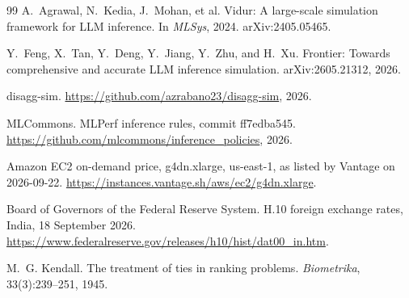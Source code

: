\documentclass[10pt,twocolumn]{article}
\begin{document}
\begin{thebibliography}{99}
A.~Agrawal, N.~Kedia, J.~Mohan, et al.
\newblock Vidur: A large-scale simulation framework for LLM inference.
\newblock In \emph{MLSys}, 2024. arXiv:2405.05465.

Y.~Feng, X.~Tan, Y.~Deng, Y.~Jiang, Y.~Zhu, and H.~Xu.
\newblock Frontier: Towards comprehensive and accurate LLM inference simulation.
\newblock arXiv:2605.21312, 2026.

disagg-sim.
\newblock \url{https://github.com/azrabano23/disagg-sim}, 2026.

MLCommons.
\newblock MLPerf inference rules, commit ff7edba545.
\newblock \url{https://github.com/mlcommons/inference_policies}, 2026.

Amazon EC2 on-demand price, g4dn.xlarge, us-east-1, as listed by Vantage on 2026-09-22.
\newblock \url{https://instances.vantage.sh/aws/ec2/g4dn.xlarge}.

Board of Governors of the Federal Reserve System.
\newblock H.10 foreign exchange rates, India, 18 September 2026.
\newblock \url{https://www.federalreserve.gov/releases/h10/hist/dat00_in.htm}.

M.~G. Kendall.
\newblock The treatment of ties in ranking problems.
\newblock \emph{Biometrika}, 33(3):239--251, 1945.

\end{thebibliography}
\end{document}
